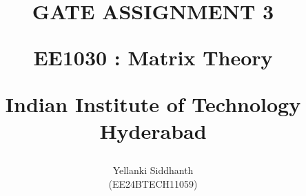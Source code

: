\documentclass[journal]{IEEEtran}
\begin{document}

\onecolumn
\title{
GATE ASSIGNMENT 3

\large{EE1030 : Matrix Theory}

Indian Institute of Technology Hyderabad
}
\author{Yellanki Siddhanth

(EE24BTECH11059)
}	




\maketitle





\bigskip

\renewcommand{\thefigure}{\theenumi}
\renewcommand{\thetable}{\theenumi}
 
\end{document}
